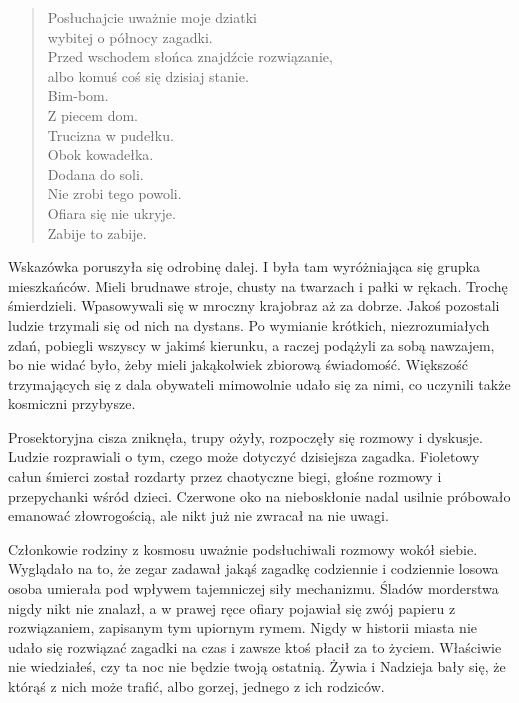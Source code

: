 \begin{sl}
\begin{quote}
Posłuchajcie uważnie moje dziatki \\
wybitej o północy zagadki. \\
Przed wschodem słońca znajdźcie rozwiązanie, \\
albo komuś coś się dzisiaj stanie. \\
Bim-bom. \\
Z piecem dom. \\
Trucizna w pudełku. \\
Obok kowadełka. \\
Dodana do soli. \\
Nie zrobi tego powoli. \\
Ofiara się nie ukryje. \\
Zabije to zabije. \\
\end{quote}
\end{sl}

Wskazówka poruszyła się odrobinę dalej.
I była tam wyróżniająca się grupka mieszkańców.
Mieli brudnawe stroje, chusty na twarzach i pałki w rękach. Trochę śmierdzieli.
Wpasowywali się w mroczny krajobraz aż za dobrze.
Jakoś pozostali ludzie trzymali się od nich na dystans.
Po wymianie krótkich, niezrozumiałych zdań, pobiegli wszyscy w jakimś kierunku, a raczej podążyli za sobą nawzajem, bo nie widać było, żeby mieli jakąkolwiek zbiorową świadomość.
Większość trzymających się z dala obywateli mimowolnie udało się za nimi, co uczynili także kosmiczni przybysze.

Prosektoryjna cisza zniknęła, trupy ożyły, rozpoczęły się rozmowy i dyskusje.
Ludzie rozprawiali o tym, czego może dotyczyć dzisiejsza zagadka.
Fioletowy całun śmierci został rozdarty przez chaotyczne biegi, głośne rozmowy i przepychanki wśród dzieci.
Czerwone oko na nieboskłonie nadal usilnie próbowało emanować złowrogością, ale nikt już nie zwracał na nie uwagi.

Członkowie rodziny z kosmosu uważnie podsłuchiwali rozmowy wokół siebie.
Wyglądało na to, że zegar zadawał jakąś zagadkę codziennie i codziennie losowa osoba umierała pod wpływem tajemniczej siły mechanizmu.
Śladów morderstwa nigdy nikt nie znalazł, a w prawej ręce ofiary pojawiał się zwój papieru z rozwiązaniem, zapisanym tym upiornym rymem.
Nigdy w historii miasta nie udało się rozwiązać zagadki na czas i zawsze ktoś płacił za to życiem.
Właściwie nie wiedziałeś, czy ta noc nie będzie twoją ostatnią. 
Żywia i Nadzieja bały się, że którąś z nich może trafić, albo gorzej, jednego z ich rodziców.

